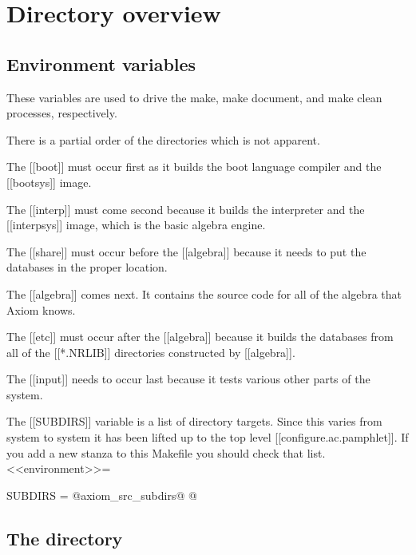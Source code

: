 \documentclass{article}
\title{\File{src/Makefile}}
\author{Timothy Daly \and Gabriel Dos~Reis}
\begin{document}
\maketitle

\begin{abstract}
\end{abstract}
\eject

\tableofcontents
\eject

\section{Directory overview}

\subsection{Environment variables}

These variables are used to drive the make, make document, and
make clean processes, respectively.

There is a partial order of the directories which is not apparent.

The [[boot]] must occur first as it builds the boot language
compiler and the [[bootsys]] image.

The [[interp]] must come second because it builds the interpreter
and the [[interpsys]] image, which is the basic algebra engine.

The [[share]] must occur before the [[algebra]] because it
needs to put the databases in the proper location.

The [[algebra]] comes next. It contains the source code for all
of the algebra that Axiom knows.

The [[etc]] must occur after the [[algebra]] because it
builds the databases from all of the [[*.NRLIB]] directories
constructed by [[algebra]].

The [[input]] needs to occur last because it tests
various other parts of the system.

The [[SUBDIRS]] variable is a list of directory targets.
Since this varies from system to system it has been lifted
up to the top level [[configure.ac.pamphlet]]. If you add a new
stanza to this Makefile you should check that list.
<<environment>>=

SUBDIRS = @axiom_src_subdirs@
@

\subsection{The  directory}
\end{document}
